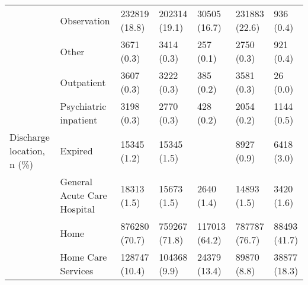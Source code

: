 \begin{tabular}{L{20em}C{10em}C{10em}C{10em}C{10em}C{10em}}
                                                   &                         \hspace{3mm} Observation &      232819 (18.8) &                           202314 (19.1) &                        30505 (16.7) &                            231883 (22.6) &                           936 (0.4) \\
                                                   &                               \hspace{3mm} Other &         3671 (0.3) &                              3414 (0.3) &                           257 (0.1) &                               2750 (0.3) &                           921 (0.4) \\
                                                   &                          \hspace{3mm} Outpatient &         3607 (0.3) &                              3222 (0.3) &                           385 (0.2) &                               3581 (0.3) &                            26 (0.0) \\
                                                   &               \hspace{3mm} Psychiatric inpatient &         3198 (0.3) &                              2770 (0.3) &                           428 (0.2) &                               2054 (0.2) &                          1144 (0.5) \\
                         Discharge location, n (\%) &                             \hspace{3mm} Expired &        15345 (1.2) &                             15345 (1.5) &                                     &                               8927 (0.9) &                          6418 (3.0) \\
                                                   &         \hspace{3mm} General Acute Care Hospital &        18313 (1.5) &                             15673 (1.5) &                          2640 (1.4) &                              14893 (1.5) &                          3420 (1.6) \\
                                                   &                                \hspace{3mm} Home &      876280 (70.7) &                           759267 (71.8) &                       117013 (64.2) &                            787787 (76.7) &                        88493 (41.7) \\
                                                   &                  \hspace{3mm} Home Care Services &      128747 (10.4) &                            104368 (9.9) &                        24379 (13.4) &                              89870 (8.8) &                        38877 (18.3) \\

\end{tabular}
